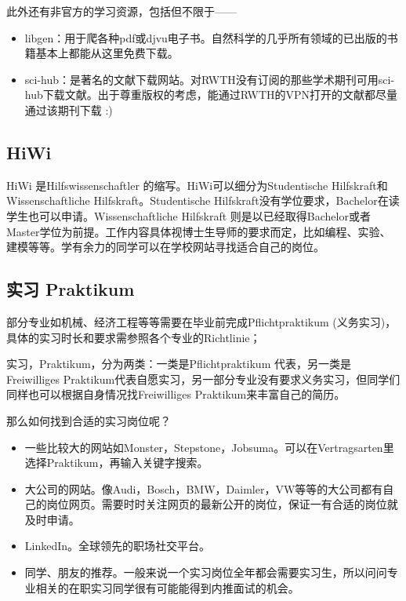     此外还有非官方的学习资源，包括但不限于——

    \begin{itemize}
      \item libgen：用于爬各种pdf或djvu电子书。自然科学的几乎所有领域的已出版的书籍基本上都能从这里免费下载。
      \item sci-hub：是著名的文献下载网站。对RWTH没有订阅的那些学术期刊可用sci-hub下载文献。出于尊重版权的考虑，能通过RWTH的VPN打开的文献都尽量通过该期刊下载 :)
    \end{itemize}

  \subsection{HiWi}

    HiWi 是Hilfswissenschaftler 的缩写。HiWi可以细分为Studentische Hilfskraft和Wissenschaftliche Hilfskraft。Studentische Hilfskraft没有学位要求，Bachelor在读学生也可以申请。Wissenschaftliche Hilfskraft 则是以已经取得Bachelor或者Master学位为前提。工作内容具体视博士生导师的要求而定，比如编程、实验、建模等等。学有余力的同学可以在学校网站寻找适合自己的岗位。 

  \subsection{实习 Praktikum}

    部分专业如机械、经济工程等等需要在毕业前完成Pflichtpraktikum (义务实习)，具体的实习时长和要求需参照各个专业的Richtlinie；

    实习，Praktikum，分为两类：一类是Pflichtpraktikum 代表，另一类是Freiwilliges Praktikum代表自愿实习，另一部分专业没有要求义务实习，但同学们同样也可以根据自身情况找Freiwilliges Praktikum来丰富自己的简历。

    那么如何找到合适的实习岗位呢？

    \begin{itemize}
      \item 一些比较大的网站如Monster，Stepstone，Jobsuma。可以在Vertragsarten里选择Praktikum，再输入关键字搜索。
      \item 大公司的网站。像Audi，Bosch，BMW，Daimler，VW等等的大公司都有自己的岗位网页。需要时时关注网页的最新公开的岗位，保证一有合适的岗位就及时申请。
      \item LinkedIn。全球领先的职场社交平台。
      \item 同学、朋友的推荐。一般来说一个实习岗位全年都会需要实习生，所以问问专业相关的在职实习同学很有可能能得到内推面试的机会。
    \end{itemize}

